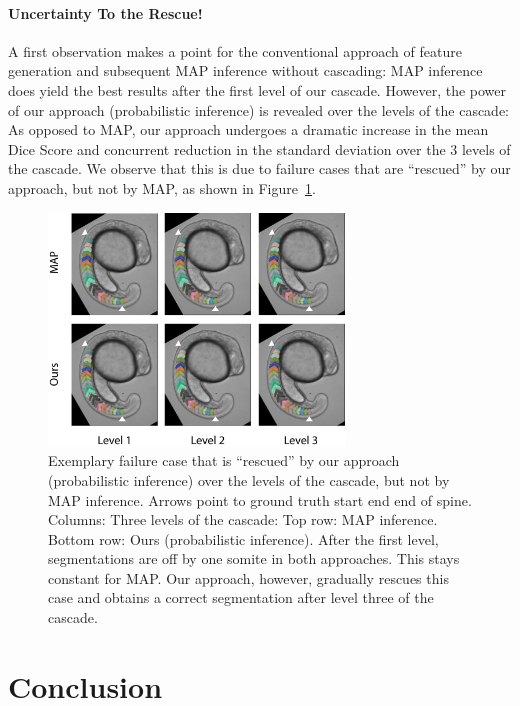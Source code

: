 \documentclass[10pt,twocolumn,letterpaper]{article}
\begin{document}
\paragraph{Uncertainty To the Rescue! }
%
A first observation makes a point for the conventional approach of feature generation and subsequent MAP inference without cascading: MAP inference does yield the best results after the first level of our cascade. However, the power of our approach (probabilistic inference) is revealed over the levels of the cascade: As opposed to MAP, our approach undergoes a dramatic increase in the mean Dice Score and concurrent reduction in the standard deviation over the 3 levels of the cascade. We observe that this is due to failure cases that are ``rescued'' by our approach, but not by MAP, as shown in Figure~\ref{fig:rescue}. 
%
\begin{figure}[t]
\begin{center}
\includegraphics[width=0.7\textwidth]{rescue.jpg} %
\caption{Exemplary failure case that is ``rescued'' by our approach (probabilistic inference) over the levels of the cascade, but not by MAP inference. Arrows point to ground truth start end end of spine. Columns: Three levels of the cascade: Top row: MAP inference. Bottom row: Ours (probabilistic inference). After the first level, segmentations are off by one somite in both approaches. This stays constant for MAP. Our approach, however, gradually rescues this case and obtains a correct segmentation after level three of the cascade.}
\label{fig:rescue}
\end{center}
\end{figure}
%

\section{Conclusion}

{\small


}
\end{document}
